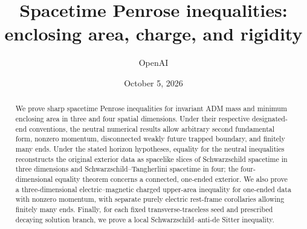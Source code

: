 \documentclass[11pt]{amsart}
\title[Spacetime Penrose inequalities]{Spacetime Penrose inequalities:\\ enclosing area, charge, and rigidity}
\author{OpenAI}
\date{October 5, 2026}
\begin{document}
\begin{abstract}
We prove sharp spacetime Penrose inequalities for invariant ADM mass and
minimum enclosing area in three and four spatial dimensions. Under their
respective designated-end conventions, the neutral numerical results allow
arbitrary second fundamental form, nonzero momentum, disconnected weakly
future trapped boundary, and finitely many ends. Under the stated horizon
hypotheses, equality for the neutral inequalities reconstructs the original
exterior data as spacelike slices of Schwarzschild spacetime in three
dimensions and Schwarzschild--Tangherlini spacetime in four; the
four-dimensional equality theorem concerns a connected, one-ended exterior.
We also prove a three-dimensional electric--magnetic charged upper-area
inequality for one-ended data with nonzero momentum, with separate purely
electric rest-frame corollaries allowing finitely many ends. Finally, for
each fixed transverse-traceless seed and prescribed decaying solution
branch, we prove a local Schwarzschild--anti-de Sitter inequality.
\end{abstract}
\maketitle
\tableofcontents




\end{document}
